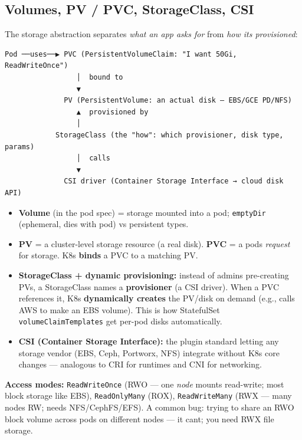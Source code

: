 \documentclass[11pt]{article}
\providecommand{\tightlist}{\setlength{\itemsep}{1pt}\setlength{\parskip}{0pt}}
\begin{document}
\subsection{Volumes, PV / PVC, StorageClass, CSI}\label{volumes-pv--pvc-storageclass-csi}

The storage abstraction separates \emph{what an app asks for} from \emph{how it\textquotesingle s provisioned}:

\setcodelang{}

\begin{verbatim}
Pod ──uses──▶ PVC (PersistentVolumeClaim: "I want 50Gi, ReadWriteOnce")
                 │  bound to
                 ▼
              PV (PersistentVolume: an actual disk — EBS/GCE PD/NFS)
                 ▲  provisioned by
                 │
            StorageClass (the "how": which provisioner, disk type, params)
                 │  calls
                 ▼
              CSI driver (Container Storage Interface → cloud disk API)
\end{verbatim}

\begin{itemize}
\tightlist
\item
  \textbf{Volume} (in the pod spec) = storage mounted into a pod; \texttt{emptyDir} (ephemeral, dies with pod) vs persistent types.
\item
  \textbf{PV} = a cluster-level storage resource (a real disk). \textbf{PVC} = a pod\textquotesingle s \emph{request} for storage. K8s \textbf{binds} a PVC to a matching PV.
\item
  \textbf{StorageClass + dynamic provisioning:} instead of admins pre-creating PVs, a StorageClass names a \textbf{provisioner} (a CSI driver). When a PVC references it, K8s \textbf{dynamically creates} the PV/disk on demand (e.g., calls AWS to make an EBS volume). This is how StatefulSet \texttt{volumeClaimTemplates} get per-pod disks automatically.
\item
  \textbf{CSI (Container Storage Interface):} the plugin standard letting any storage vendor (EBS, Ceph, Portworx, NFS) integrate without K8s core changes --- analogous to CRI for runtimes and CNI for networking.
\end{itemize}

\textbf{Access modes:} \texttt{ReadWriteOnce} (RWO --- one \emph{node} mounts read-write; most block storage like EBS), \texttt{ReadOnlyMany} (ROX), \texttt{ReadWriteMany} (RWX --- many nodes RW; needs NFS/CephFS/EFS). A common bug: trying to share an RWO block volume across pods on different nodes --- it can\textquotesingle t; you need RWX file storage.
\end{document}
